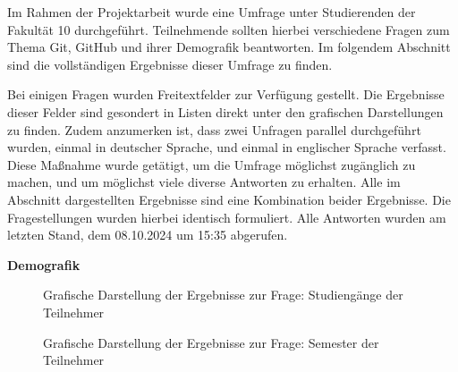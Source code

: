 \documentclass[
	ngerman,
	BCOR=8mm,
	headings=normal,
	parskip=half,
	headsepline,
	automark,
	listof=totoc,
	bibliography=totoc,
]{scrreprt}
\begin{document}
%

\cleardoublepage
{}


\cleardoublepage
{}
\tableofcontents
\listoffigures
\printglossary
\printglossary[type=\acronymtype, title={Abkürzungsverzeichnis}]
\printglossary[type=symbols, title={Symbolverzeichnis}]
%
\cleardoublepage
{}





%
\printbibliography
%
\appendix
{}
\newline

Im Rahmen der Projektarbeit wurde eine Umfrage unter Studierenden der Fakultät 10 durchgeführt. 
Teilnehmende sollten hierbei verschiedene Fragen zum Thema Git, GitHub und ihrer Demografik beantworten. 
Im folgendem Abschnitt sind die vollständigen Ergebnisse dieser Umfrage zu finden.
\par
Bei einigen Fragen wurden Freitextfelder zur Verfügung gestellt. 
Die Ergebnisse dieser Felder sind gesondert in Listen direkt unter den grafischen Darstellungen zu finden. \newline 
Zudem anzumerken ist, dass zwei Unfragen parallel durchgeführt wurden, einmal in deutscher Sprache, und einmal in englischer Sprache verfasst. 
Diese Maßnahme wurde getätigt, um die Umfrage möglichst zugänglich zu machen, und um möglichst viele diverse Antworten zu erhalten. 
Alle im Abschnitt dargestellten Ergebnisse sind eine Kombination beider Ergebnisse. Die Fragestellungen wurden hierbei identisch formuliert. 
Alle Antworten wurden am letzten Stand, dem 08.10.2024 um 15:35 abgerufen.

\newpage
{\LARGE \textbf{Demografik}}
\newline

\begin{figure}[h!]
    \centering
    
    \caption{Grafische Darstellung der Ergebnisse zur Frage: Studiengänge der Teilnehmer}
\end{figure}

\begin{figure}[h!]
    \centering
    
    \caption{Grafische Darstellung der Ergebnisse zur Frage: Semester der Teilnehmer}
\end{figure}
\end{document}
